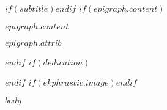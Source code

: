 $if(subtitle)$$endif$
$if(epigraph.content)$\epigraph{$epigraph.content$}{$epigraph.attrib$}$endif$
$if(dedication)$\dedication{$dedication$}$endif$
$if(ekphrastic.image)$$endif$

\begin{$genre$}

    $body$

\end{$genre$}
